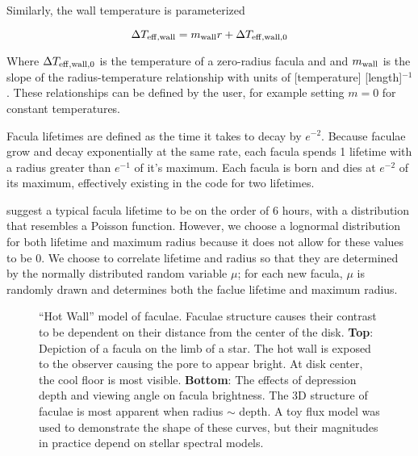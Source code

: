 \documentclass[twocolumn]{aastex631}
\begin{document}
Similarly, the wall temperature is parameterized

\begin{equation}
    \Delta T_{\rm eff,wall} = m_{\rm wall}r + \Delta T_{\rm eff,wall,0}
\end{equation}

Where $\Delta T_{\rm eff,wall,0}$ is the temperature of a zero-radius facula and and $m_{\rm wall}$ is the slope of the radius-temperature
relationship with units of [temperature] [length]$^{-1}$.
These relationships can be defined by the user, for example setting $m=0$ for constant temperatures.

Facula lifetimes are defined as the time it takes to decay by $e^{-2}$. Because faculae grow and decay exponentially
at the same rate, each facula spends 1 lifetime with a radius greater than $e^{-1}$ of it's maximum. Each facula is born
and dies at $e^{-2}$ of its maximum, effectively existing in the code for two lifetimes.

\citet{hovis-afflerbach2022} suggest a typical facula lifetime to be on the order of 6 hours,
with a distribution that resembles a Poisson function. However, we choose a lognormal distribution
for both lifetime and maximum radius because it does not allow for these values to be 0. We choose to
correlate lifetime and radius so that they are determined by the normally distributed random variable $\mu$;
for each new facula, $\mu$ is randomly drawn and determines both the faclue lifetime and maximum radius.

\begin{figure}
    \centering
    \caption{
        ``Hot Wall'' model of faculae. Faculae structure causes their contrast to be dependent on their distance
        from the center of the disk. {\bf Top}: Depiction of a facula on the limb of a star. The hot wall is exposed
        to the observer causing the pore to appear bright. At disk center, the cool floor is most visible. {\bf Bottom}:
        The effects of depression depth and viewing angle on facula brightness. The 3D structure of faculae is most apparent
        when radius $\sim$ depth. A toy flux model was used to demonstrate the shape of these curves, but their magnitudes
        in practice depend on stellar spectral models.
        }
    \label{fig:fac_struct}
\end{figure}


\end{document}
